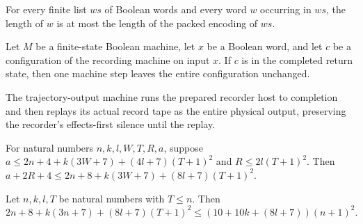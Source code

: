 \begin{lemma}
\label{Complexity.clFields_width}
\leanok
{}
For every finite list $ws$ of Boolean words and every word $w$ occurring in $ws$, the
length of $w$ is at most the length of the packed encoding of $ws$.
\end{lemma}

\begin{lemma}
\label{Complexity.clRecord_idle}
\leanok
{}
Let $M$ be a finite-state Boolean machine, let $x$ be a Boolean word, and let $c$ be a
configuration of the recording machine on input $x$. If $c$ is in the completed return
state, then one machine step leaves the entire configuration unchanged.
\end{lemma}

\begin{definition}
\label{Complexity.clRecordOutputTM}
\leanok
{}
The trajectory-output machine runs the prepared recorder host to completion and then replays its actual record tape as the entire physical output, preserving the recorder's effects-first silence until the replay.
\end{definition}

\begin{lemma}
\label{Complexity.clRecord_replay_budget}
\leanok
{}
For natural numbers $n,k,l,W,T,R,a$, suppose $a\le 2n+4+k(3W+7)+(4l+7)(T+1)^2$ and $R\le
2l(T+1)^2$. Then $a+2R+4\le 2n+8+k(3W+7)+(8l+7)(T+1)^2$.
\end{lemma}

\begin{lemma}
\label{Complexity.clRecord_size_budget}
\leanok
{}
Let $n,k,l,T$ be natural numbers with $T\le n$. Then
\[
2n+8+k(3n+7)+(8l+7)(T+1)^2\le (10+10k+(8l+7))(n+1)^2.
\]
\end{lemma}

